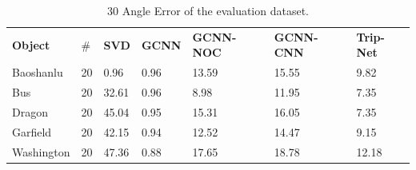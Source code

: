 \documentclass[border=15pt, multi, tikz]{article}
\newcommand{\tabhead}[1]{\textbf{#1}}
\begin{document}
\begin{table}[H]
	
	\centering
	\begin{tabular}{l l l l l l l }
		\tabhead{Object} & $ \# $ & \tabhead{SVD} & \tabhead{GCNN} & \tabhead{GCNN-NOC} & \tabhead{GCNN-CNN} & \tabhead{Trip-Net}\\
		Baoshanlu  & 20 & 0.96  &0.96 & 13.59 & 15.55 & 9.82\\ 
		\hline
		Bus & 20 & 32.61  & 0.96 & 8.98 & 11.95 & 7.35\\ 
		\hline
		Dragon & 20 & 45.04& 0.95 & 15.31 & 16.05 & 7.35\\
		\hline
		Garfield & 20 & 42.15& 0.94 & 12.52 & 14.47 & 9.15\\
		\hline
		Washington & 20 & 47.36 &0.88 & 17.65 & 18.78 & 12.18\\
	\end{tabular}
	\caption{30 Angle Error of the evaluation dataset.}	
	\label{tab:gcnn-eval-d30}
\end{table}
\end{document}
